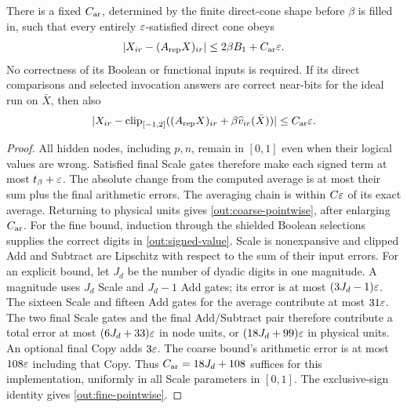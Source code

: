 \begin{lemma}\label{out:direct-cone}
There is a fixed $C_{\rm ar}$, determined by the finite direct-cone
shape before $\beta$ is filled in, such that every entirely
$\varepsilon$-satisfied direct cone obeys
\begin{equation}\label{out:coarse-pointwise}
 |X_{ir}-(A_{\rm rep}X)_{ir}|
       \leq2\beta B_1+C_{\rm ar}\varepsilon.
\end{equation}
No correctness of its Boolean or functional inputs is required.
If its direct comparisons and selected invocation answers are correct
near-bits for the ideal run on $\bar X$, then also
\begin{equation}\label{out:fine-pointwise}
 |X_{ir}-\operatorname{clip}_{[-1,2]}((A_{\rm rep}X)_{ir}
                +\beta\widehat v_{ir}(\bar X))|
       \leq C_{\rm ar}\varepsilon.
\end{equation}
\end{lemma}
\begin{proof}
All hidden nodes, including $p,n$, remain in $[0,1]$ even when their
logical values are wrong. Satisfied final Scale gates therefore make
each signed term at most $t_\beta+\varepsilon$. The absolute change from the
computed average is at most their sum plus the final arithmetic errors.
The averaging chain is within $C\varepsilon$ of its exact average. Returning
to physical units gives \eqref{out:coarse-pointwise}, after enlarging
$C_{\rm ar}$. For the fine bound, induction through the shielded
Boolean selections supplies the correct digits in
\eqref{out:signed-value}. Scale is nonexpansive and clipped Add and
Subtract are Lipschitz with respect to the sum of their input errors.
For an explicit bound, let $J_d$ be the number of dyadic digits in
one magnitude. A magnitude uses $J_d$ Scale and $J_d-1$ Add gates;
its error is at most $(3J_d-1)\varepsilon$. The sixteen Scale and fifteen Add
gates for the average contribute at most $31\varepsilon$. The two final
Scale gates and the final Add/Subtract pair therefore contribute a
total error at most $(6J_d+33)\varepsilon$ in node units, or
$(18J_d+99)\varepsilon$ in physical units. An optional final Copy adds
$3\varepsilon$. The coarse bound's arithmetic error is at most $108\varepsilon$
including that Copy. Thus $C_{\rm ar}=18J_d+108$ suffices for this
implementation, uniformly in all Scale parameters in $[0,1]$.
The exclusive-sign identity gives \eqref{out:fine-pointwise}.
\end{proof}

